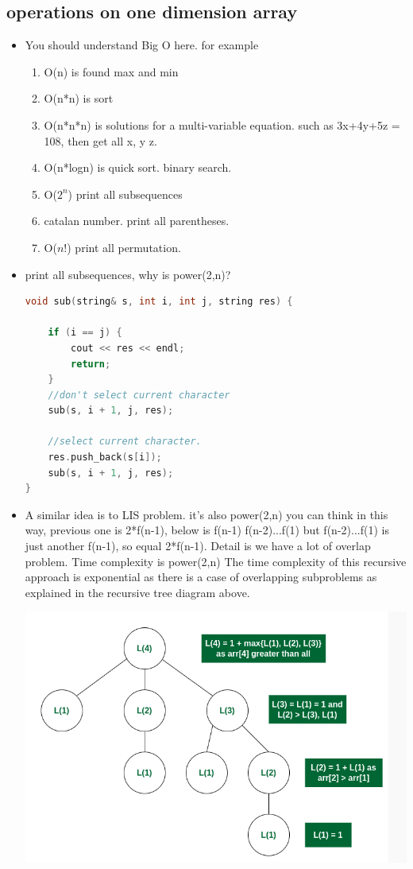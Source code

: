 \documentclass[a4paper,11pt,twoside]{book}
\begin{document}
\subsection{operations on one dimension array}
\begin{itemize}
	\item You should understand Big O here. for example 
	\begin{enumerate}
		\item O(n) is found max and min
		\item O(n*n) is sort
		\item O(n*n*n) is  solutions for a multi-variable equation. such as 3x+4y+5z = 108, then get all x, y z.
		\item O(n*logn) is quick sort. binary search. 
		\item O($2^{n}$) print all subsequences
		\item catalan number. print all parentheses.
		\item O($n!$) print all permutation.
		
	\end{enumerate}
	
	
	\item print all subsequences, why is power(2,n)?
\begin{lstlisting}[frame=single, language=c++]
void sub(string& s, int i, int j, string res) {
	
	if (i == j) {
		cout << res << endl;
		return;
	}
	//don't select current character
	sub(s, i + 1, j, res);
	
	//select current character.
	res.push_back(s[i]);
	sub(s, i + 1, j, res);
}
\end{lstlisting}


	\item A similar idea is to LIS problem. it's also power(2,n)
you can think in this way, previous one is 2*f(n-1), below is f(n-1) f(n-2)...f(1)
but f(n-2)...f(1) is just another f(n-1), so equal 2*f(n-1). Detail is we have a lot of overlap problem.
Time complexity is power(2,n) The time complexity of this recursive approach is exponential as there is a case of overlapping subproblems as explained in the recursive tree diagram above.
\begin{center}
	\includegraphics[width=0.7\linewidth]{pics/lis}
\end{center}


\end{itemize}
\end{document}
